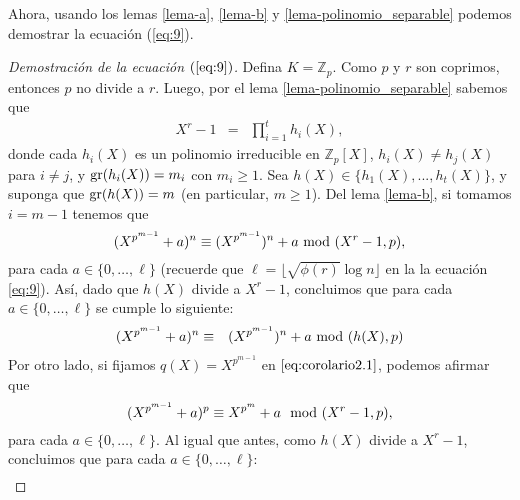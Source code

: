 	Ahora, usando los lemas \ref{lema-a}, \ref{lema-b} y \ref{lema-polinomio_separable} podemos demostrar la ecuación (\ref{eq:9}).
	\begin{proof}[Demostración de la ecuación $(\ref{eq:9})$]
		Defina $K = \mathbb{Z}_p$. Como $p$ y $r$ son coprimos, entonces $p$ no divide a $r$. Luego, por el lema \ref{lema-polinomio_separable} sabemos que 
		\begin{eqnarray*}
		X^r-1 & = & \prod_{i=1}^{t}h_i(X),
		\end{eqnarray*}	
		donde cada $h_i(X)$ es un polinomio irreducible en $\mathbb{Z}_p[X]$, $h_i(X)\neq h_j(X)$ para $i\neq j$, y ${\rm gr}(h_i(X))=m_i$ con $m_i\geq 1$. Sea $h(X) \in \{h_1(X),...,h_t(X)\}$, y suponga que ${\rm gr}(h(X))=m$ (en particular, $m \geq 1$).
                Del lema \ref{lema-b}, si tomamos $i=m-1$ tenemos que $$(X^{p^{m-1}}+a)^n\equiv (X^{p^{m-1}})^n +a \!\!\mod (X^r-1,p),$$ para cada $a \in \{0, \ldots, \ell\}$ (recuerde que $\ell=\lfloor \sqrt{\phi(r)}\log  n\rfloor$ en la la ecuación \eqref{eq:9}). Así, dado que $h(X)$ divide a $X^r-1$, concluimos que para cada $a \in \{0, \ldots, \ell\}$ se cumple lo siguiente:
		\begin{eqnarray}
		    (X^{p^{m-1}}+a)^n & \equiv & (X^{p^{m-1}})^n +a \!\!\mod (h(X),p) \label{eq:ast} 
		\end{eqnarray}
		Por otro lado, si fijamos $q(X)=X^{p^{m-1}}$ en $\eqref{eq:corolario2.1}$, podemos afirmar que $$(X^{p^{m-1}}+a)^p\equiv X^{p^{m}} +a \mod (X^r-1,p),$$ para cada $a \in \{0, \ldots, \ell\}$.  Al igual que antes, como $h(X)$ divide a $X^r-1$, concluimos que para cada $a \in \{0, \ldots, \ell\}$:
		\begin{eqnarray}

\end{eqnarray}
\end{proof}
